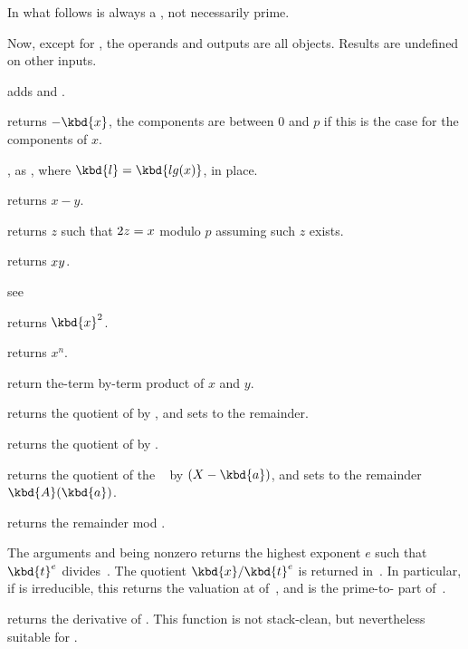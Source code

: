  In what follows  is always a ,
not necessarily prime.

\noindent Now, except for , the operands and outputs are all 
objects. Results are undefined on other inputs.

 adds  and .

 returns $-\kbd{x}$, the components are
between $0$ and $p$ if this is the case for the components of $x$.

, as , where
$\kbd{l} = \kbd{lg(x)}$, in place.

 returns $x-y$.

 returns $z$ such that $2\*z = x$ modulo
$p$ assuming such $z$ exists.

 returns $x\*y$.

see 

 returns $\kbd{x}^2$.

 returns $x^n$.

 return the-term by-term product of $x$
and $y$.

 returns the quotient
of  by , and sets  to the remainder.

 returns the quotient of  by
.

 returns the
quotient of the ~ by $(X - \kbd{a})$, and sets  to the
remainder $\kbd{A}(\kbd{a})$.

 returns the remainder  mod
.

 The arguments  and
 being nonzero  returns the highest exponent $e$ such that
$\kbd{t}^{e}$ divides~. The quotient $\kbd{x}/\kbd{t}^{e}$ is returned
in~. In particular, if  is irreducible, this returns the
valuation at  of~, and  is the prime-to- part
of~.

 returns the derivative of .
This function is not stack-clean, but nevertheless suitable for
.

